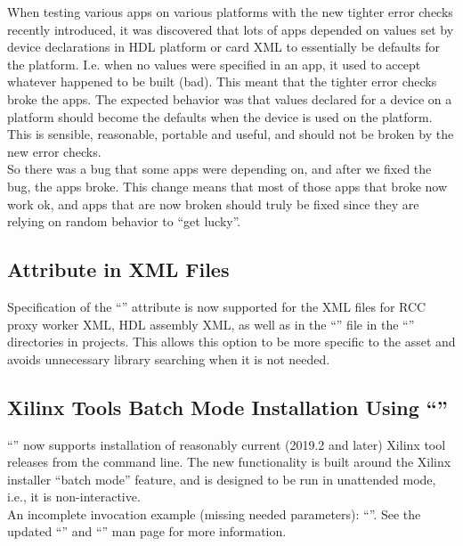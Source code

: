 When testing various apps on various platforms with the new tighter error checks recently introduced, it was discovered that lots of apps depended on values set by device declarations in HDL platform or card XML to essentially be defaults for the platform. I.e. when no values were specified in an app, it used to accept whatever happened to be built (bad). This meant that the tighter error checks broke the apps. The expected behavior was that values declared for a device on a platform should become the defaults when the device is used on the platform. This is sensible, reasonable, portable and useful, and should not be broken by the new error checks.\\

So there was a bug that some apps were depending on, and after we fixed the bug, the apps broke.  This change means that most of those apps that broke now work ok, and apps that are now broken should truly be fixed since they are relying on random behavior to ``get lucky''.\\

\subsection{ Attribute in XML Files}
\label{sec:25_attr}
Specification of the ``'' attribute is now supported for the XML files for RCC proxy worker XML, HDL assembly XML, as well as in the ``'' file in the ``'' directories in projects.  This allows this option to be more specific to the asset and avoids unnecessary library searching when it is not needed.\\

\subsection{Xilinx Tools Batch Mode Installation Using ``''}
\label{sec:25_xilinx_batch}
``'' now supports installation of reasonably current (2019.2 and later) Xilinx tool releases from the command line. The new functionality is built around the Xilinx installer ``batch mode'' feature, and is designed to be run in unattended mode, i.e., it is non-interactive.\\

An incomplete invocation example (missing needed parameters): ``''.  See the updated ``'' and ``'' man page for more information.\\

